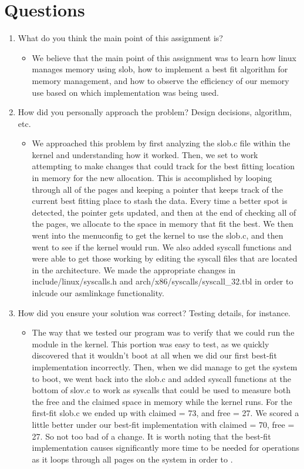 \documentclass[journal,10pt,onecolumn,compsoc]{IEEEtran} \usepackage[margin=1.0in]{geometry} \usepackage{pdfpages}
\begin{document}
\section {Questions}
\begin {enumerate}
\item What do you think the main point of this assignment is?
	\begin{itemize}
    	\item We believe that the main point of this assignment was to learn how linux manages memory using slob, how to implement a best fit algorithm for memory management, and how to observe the efficiency of our memory use based on which implementation was being used.
        
    \end{itemize}
\item How did you personally approach the problem? Design decisions, algorithm, etc.
	\begin{itemize}
    	\item We approached this problem by first analyzing the slob.c file within the kernel and understanding how it worked. Then, we set to work attempting to make changes that could track for the best fitting location in memory for the new allocation. This is accomplished by looping through all of the pages and keeping a pointer that keeps track of the current best fitting place to stash the data. Every time a better spot is detected, the pointer gets updated, and then at the end of checking all of the pages, we allocate to the space in memory that fit the best. We then went into the menuconfig to get the kernel to use the slob.c, and then went to see if the kernel would run. We also added syscall functions and were able to get those working by editing the syscall files that are located in the architecture. We made the appropriate changes in include/linux/syscalls.h and arch/x86/syscalls/syscall\_32.tbl in order to inlcude our asmlinkage functionality.
        
    \end{itemize}
\item How did you ensure your solution was correct? Testing details, for instance.
	\begin{itemize}
    	\item The way that we tested our program was to verify that we could run the module in the kernel. This portion was easy to test, as we quickly discovered that it wouldn't boot at all when we did our first best-fit implementation incorrectly. Then, when we did manage to get the system to boot, we went back into the slob.c and added syscall functions at the bottom of slov.c to work as syscalls that could be used to measure both the free and the claimed space in memory while the kernel runs. For the first-fit slob.c we ended up with claimed = 73, and free = 27. We scored a little better under our best-fit implementation with claimed = 70, free = 27. So not too bad of a change. It is worth noting that the best-fit implementation causes significantly more time to be needed for operations as it loops through all pages on the system in order to .
        

\end{itemize}
\end{enumerate}
\end{document}
